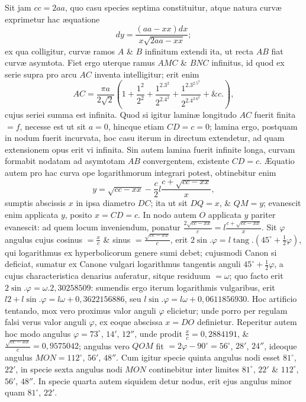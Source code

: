 Sit jam $cc=2aa$, quo casu species septima constituitur, atque natura curvæ exprimetur hac æquatione
\[dy=\frac{(aa-xx)dx}{x\sqrt{2aa-xx}};\]
ex qua colligitur, curvæ ramos $A$ \& $B$ infinitum extendi ita, ut recta $AB$ fiat curvæ asymtota. Fiet ergo uterque ramus $AMC$ \& $BNC$ infinitus, id quod ex serie supra pro arcu $AC$ inventa intelligitur; erit enim
\[AC=\frac{\pi a}{2\sqrt2}\left(1+\frac{1^2}{2^2}+\frac{1^2.3^2}{2^2.4^2}+\frac{1^2.3^2.5^2}{2^2.4^2.6^2}+\&c.\right),\]
cujus seriei summa est infinita. Quod si igitur laminæ longitudo $AC$ fuerit finita $=f$, necesse est ut sit $a=0$, hincque etiam $CD=c=0$; lamina ergo, postquam in nodum fuerit incurvata, hoc casu iterum in directum extendetur, ad quam extensionem opus erit vi infinita. Sin autem lamina fuerit infinite longa, curvam formabit nodatam ad asymtotam $AB$ convergentem, existente $CD=c$. Æquatio autem pro hac curva ope logarithmorum integrari potest, obtinebitur enim
\[y=\sqrt{cc-xx}-\frac c2l\frac{c+\sqrt{cc-xx}}x,\]
sumptis abscissis $x$ in ipsa diametro $DC$; ita ut sit $DQ=x$, \& $QM=y$; evanescit enim applicata $y$, posito $x=CD=c$. In nodo autem $O$ applicata $y$ pariter evanescit: ad quem locum inveniendum, ponatur $\frac{2\sqrt{cc-xx}}c=l\frac{c+\sqrt{cc-xx}}x$. Sit $\varphi$ angulus cujus cosinus $=\frac xc$ \& sinus $=\frac{\sqrt{cc-xx}}c$, erit $2\sin.\varphi=l\operatorname{tang}.(45^\circ+\frac12\varphi)$, qui logarithmus ex hyperbolicorum genere sumi debet; cujusmodi Canon si deficiat, sumatur ex Canone vulgari logarithmus tangentis anguli $45^\circ+\frac12\varphi$, a cujus characteristica denarius auferatur, sitque residuum $=\omega$; quo facto erit $2\sin.\varphi=\omega.2{,}30258509$: sumendis ergo iterum logarithmis vulgaribus, erit $l2+l\sin.\varphi=l\omega+0{,}3622156886$, seu $l\sin.\varphi=l\omega+0{,}0611856930$. Hoc artificio tentando, mox vero proximus valor anguli $\varphi$ elicietur; unde porro per regulam falsi verus valor anguli $\varphi$, ex eoque abscissa $x=DO$ definietur. Reperitur autem hoc modo angulus $\varphi=73^\circ$, $14'$, $12''$, unde prodit $\frac xc=0{,}2884191$, \& $\frac{\sqrt{cc-xx}}c=0{,}9575042$; angulus vero $QOM$ fit $=2\varphi-90^\circ=56^\circ$, $28'$, $24''$, ideoque angulus $MON=112^\circ$, $56'$, $48''$. Cum igitur specie quinta angulus nodi esset $81^\circ$, $22'$, in
specie sexta angulus nodi $MON$ continebitur inter limites $81^\circ$, $22'$ \& $112^\circ$, $56'$, $48''$. In specie quarta autem siquidem detur nodus, erit ejus angulus minor quam $81^\circ$, $22'$.

